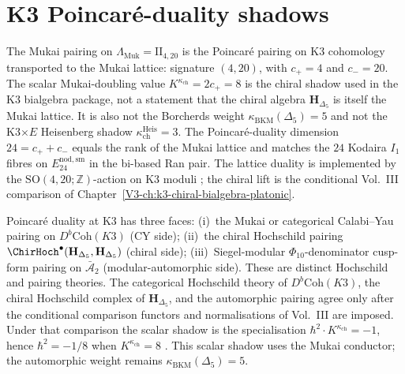 \section{K3 Poincar\'e-duality shadows}
\label{sec:pd-supplement}

\begin{remark}
\label{rem:pd-1}
The Mukai pairing on
$\Lambda_{\mathrm{Muk}}=\mathrm{II}_{4,20}$ is the
Poincar\'e pairing on K3 cohomology transported to the Mukai lattice:
signature $(4,20)$, with $c_+=4$ and $c_-=20$. The scalar
Mukai-doubling value $K^{\kappa_{\mathrm{ch}}}=2c_+=8$ is the
chiral shadow used in the K3 bialgebra package, not a statement that
the chiral algebra $\mathbf H_{\Delta_5}$ is itself the Mukai
lattice. It is also not the Borcherds weight
$\kappa_{\mathrm{BKM}}(\Delta_5)=5$ and not the K3$\times E$
Heisenberg shadow $\kappa_{\mathrm{ch}}^{\mathrm{Heis}}=3$. The
Poincar\'e-duality dimension $24=c_++c_-$ equals the rank of the
Mukai lattice and matches the $24$ Kodaira $I_1$ fibres on
$E^{\mathrm{nod,sm}}_{24}$ in the bi-based Ran pair. The lattice
duality is implemented by the $\mathrm{SO}(4,20;\mathbb Z)$-action
on K3 moduli \cite{Mukai1987,Borcherds1998}; the chiral lift is the
conditional Vol.~III comparison of
Chapter~\ref{V3-ch:k3-chiral-bialgebra-platonic}.
\end{remark}

\begin{remark}
\label{rem:pd-2}
Poincar\'e duality at K3 has three faces:
(i)~the Mukai or categorical Calabi--Yau pairing on
$D^b\mathrm{Coh}(K3)$ (CY side);
(ii)~the chiral Hochschild pairing
$\ChirHoch^\bullet(\mathbf H_{\Delta_5},\mathbf H_{\Delta_5})$
(chiral side);
(iii)~Siegel-modular $\Phi_{10}$-denominator cusp-form pairing on
$\bar{\mathcal A}_2$ (modular-automorphic side).
These are distinct Hochschild and pairing theories. The categorical
Hochschild theory of $D^b\mathrm{Coh}(K3)$, the chiral Hochschild
complex of $\mathbf H_{\Delta_5}$, and the automorphic pairing agree
only after the conditional comparison functors and normalisations of
Vol.~III are imposed. Under that comparison the scalar shadow is the
specialisation $\hbar^2\cdot K^{\kappa_{\mathrm{ch}}}=-1$, hence
$\hbar^2=-1/8$ when $K^{\kappa_{\mathrm{ch}}}=8$
\cite{Lusztig1990,PasolZagier2013}. This scalar shadow uses the
Mukai conductor; the automorphic weight remains
$\kappa_{\mathrm{BKM}}(\Delta_5)=5$.
\end{remark}

